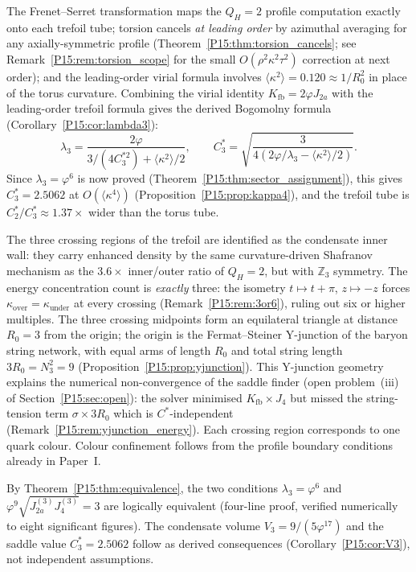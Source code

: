 \documentclass[11pt,a4paper]{article}
\theoremstyle{definition}\newtheorem{definition}[theorem]{Definition}
\theoremstyle{remark}
\newcommand{\vp}{\varphi}
\newcommand{\lam}{\lambda}
\newcommand{\Ja}{J_{2a}}
\newcommand{\Jfour}{J_4}
\newcommand{\Kfb}{K_{\mathrm{fb}}}
\newcommand{\QH}{Q_H}
\begin{document}
The Frenet--Serret transformation maps the $\QH=2$ profile
computation exactly onto each trefoil tube; torsion cancels
\emph{at leading order} by azimuthal averaging for any axially-symmetric
profile (Theorem~\ref{P15:thm:torsion_cancels}; see
Remark~\ref{P15:rem:torsion_scope} for the small $O(\rho^2\kappa^2\tau^2)$
correction at next order); and the leading-order
virial formula involves $\langle\kappa^2\rangle=0.120\approx 1/R_0^2$
in place of the torus curvature.
Combining the virial identity $\Kfb=2\vp\Ja$ with the
leading-order trefoil formula gives the derived Bogomolny formula
(Corollary~\ref{P15:cor:lambda3}):
\begin{equation*}
  \lam_3 = \frac{2\vp}{3/(4C_3^{*2})+\langle\kappa^2\rangle/2},
  \qquad
  C_3^* = \sqrt{\frac{3}{4(2\vp/\lam_3-\langle\kappa^2\rangle/2)}}.
\end{equation*}
Since $\lam_3=\vp^6$ is now proved (Theorem~\ref{P15:thm:sector_assignment}),
this gives $C_3^*=2.5062$ at $O(\langle\kappa^4\rangle)$
(Proposition~\ref{P15:prop:kappa4}), and the trefoil tube is
$C_2^*/C_3^*\approx1.37\times$ wider than the torus tube.

The three crossing regions of the trefoil are identified as the
condensate inner wall: they carry enhanced density by the same
curvature-driven Shafranov mechanism as the $3.6\times$ inner/outer
ratio of $\QH=2$, but with $\mathbb{Z}_3$ symmetry.
The energy concentration count is \emph{exactly} three: the isometry
$t\mapsto t+\pi$, $z\mapsto -z$ forces $\kappa_{\mathrm{over}}=
\kappa_{\mathrm{under}}$ at every crossing (Remark~\ref{P15:rem:3or6}),
ruling out six or higher multiples.
The three crossing midpoints form an equilateral triangle at distance
$R_0=3$ from the origin; the origin is the Fermat--Steiner Y-junction
of the baryon string network, with equal arms of length $R_0$ and total
string length $3R_0=N_3^2=9$ (Proposition~\ref{P15:prop:yjunction}).
This Y-junction geometry explains the numerical non-convergence of
the saddle finder (open problem~(iii) of Section~\ref{P15:sec:open}):
the solver minimised $\Kfb\times J_4$ but missed the string-tension
term $\sigma\times 3R_0$ which is $C^*$-independent
(Remark~\ref{P15:rem:yjunction_energy}).
Each crossing region corresponds to one quark colour.
Colour confinement follows from the profile boundary conditions
already in Paper~I.

By Theorem~\ref{P15:thm:equivalence}, the two conditions
$\lam_3=\vp^6$ and $\vp^9\sqrt{\Ja^{(3)}\Jfour^{(3)}}=3$ are logically
equivalent (four-line proof, verified numerically to eight significant figures).
The condensate volume $V_3=9/(5\vp^{17})$ and the saddle value $C_3^*=2.5062$
follow as derived consequences (Corollary~\ref{P15:cor:V3}), not independent
assumptions.
\end{document}

